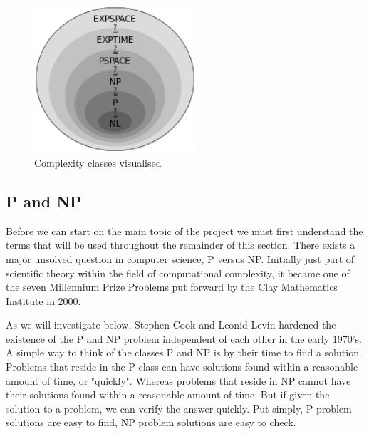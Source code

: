 \documentclass{article}
\begin{document}
\begin{figure}[h]
    \caption{Complexity classes visualised \cite{complex}}
    \includegraphics[width=6cm]{complexity.png}
    \centering
\end{figure}

\subsection{P and NP}
Before we can start on the main topic of the project we must first understand the terms that will be used throughout the remainder of this
section. There exists a major unsolved question in computer science, P versus NP. Initially just part of scientific theory within the field
of computational complexity, it became one of the seven Millennium Prize Problems put forward by the Clay Mathematics Institute in 2000.

As we will investigate below, Stephen Cook and Leonid Levin hardened the existence of the P and NP problem independent of each other in the early 1970's. A
simple way to think of the classes P and NP is by their time to find a solution. Problems that reside in the P class can have solutions
found within a reasonable amount of time, or "quickly". Whereas problems that reside in NP cannot have their solutions found within a
reasonable amount of time. But if given the solution to a problem, we can verify the answer quickly. Put simply, P problem solutions are
easy to find, NP problem solutions are easy to check.
\end{document}
